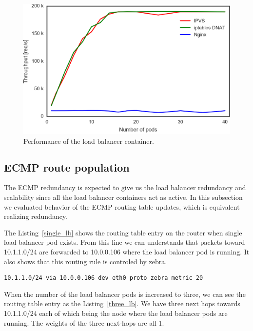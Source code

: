 \begin{figure}
\includegraphics[width=\columnwidth]{Figs/ipvs-iptables-nginx}
\caption{Performance of the load balancer container.}
\label{fig:ipvs-iptables-nginx}
\end{figure}

\subsection{ECMP route population}

The ECMP redundancy is expected to give us the load balancer redundancy and scalability since all the load balancer containers act as active.
In this subsection we evaluated behavior of the ECMP routing table updates, which is equivalent realizing redundancy. 

The Listing~\ref{single_lb} shows the routing table entry on the router when single load balancer pod exists.
From this line we can understands that packets toward 10.1.1.0/24 are forwarded to 10.0.0.106 where the load balancer pod is running.
It also shows that this routing rule is controled by zebra.

\begin{lstlisting}[language=bash,caption=Routing table entry with single load balancer pod.,label=single_lb]
10.1.1.0/24 via 10.0.0.106 dev eth0 proto zebra metric 20
\end{lstlisting}

When the number of the load balancer pods is increased to three, we can see the routing table entry as the Listing~\ref{three_lb}.
We have three next hops towards 10.1.1.0/24 each of which being the node where the load balancer pods are running.
The weights of the three next-hops are all 1.   

